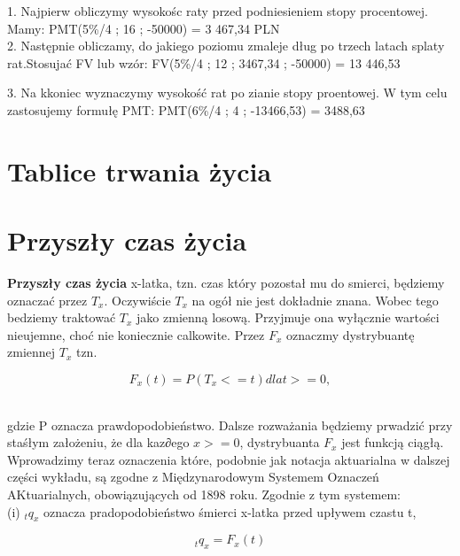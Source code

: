 \documentclass{article}
\begin{document}
1. Najpierw obliczymy wysokośc raty przed podniesieniem stopy procentowej. Mamy: PMT(5\%/4 ; 16 ; -50000) = 3 467,34 PLN\\

2. Następnie obliczamy, do jakiego poziomu zmaleje dług po trzech latach splaty rat.Stosujać FV lub wzór: FV(5\%/4 ; 12 ; 3467,34 ; -50000) = 13 446,53\

3. Na kkoniec wyznaczymy wysokość rat po zianie stopy proentowej. W tym celu zastosujemy formułę PMT: PMT(6\%/4 ; 4 ; -13466,53) = 3488,63\\

\newpage

\section{Tablice trwania życia}

\section{Przyszły czas życia}

\textbf{Przyszły czas życia} x-latka, tzn. czas który pozostał mu do smierci, będziemy oznaczać przez $ T_x $. Oczywiście $ T_x $ na ogół nie jest dokładnie znana. Wobec tego bedziemy traktować $ T_x $ jako zmienną losową. Przyjmuje ona wyłącznie wartości nieujemne, choć nie koniecznie calkowite. Przez $ F_x $ oznaczmy dystrybuantę zmiennej $ T_x $ tzn.

\begin{center}
	\begin{equation}
		F_x(t) = P(T_x <= t) dla t>= 0,
	\end{equation}
\end{center}\\

gdzie P oznacza prawdopodobieństwo. Dalsze rozważania będziemy prwadzić przy staśłym założeniu, że dla kaz∂ego $ x >= 0 $, dystrybuanta $ F_x $ jest funkcją ciągłą.\\

Wprowadzimy teraz oznaczenia które, podobnie jak notacja aktuarialna w dalszej części wykładu, są zgodne z Międzynarodowym Systemem Oznaczeń AKtuarialnych, obowiązujących od 1898 roku. Zgodnie z tym systemem:\\

(i) $ _tq_x $ oznacza pradopodobieństwo śmierci x-latka przed upływem czastu t,\\

\begin{center}
	\begin{equation}
		_tq_x = F_x(t)
	\end{equation}
\end{center}\\
\end{document}
